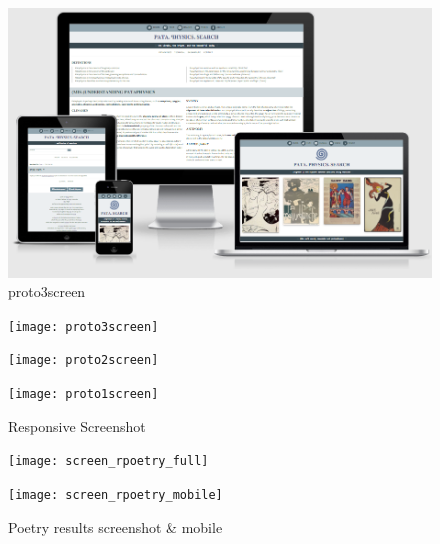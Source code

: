 \begin{figure}[!htbp] %
  \centering
  \includegraphics[width=\linewidth]{images/proto3screen}
\caption[proto3screen]{proto3screen}
\label{img:proto3screen}
\end{figure}

\begin{figure}[!htbp]
  \centering
  \begin{minipage}{\linewidth}
    \texttt{[image: proto3screen]}
  \end{minipage}
  \hspace{.05\linewidth}
  \begin{minipage}{\linewidth}
    \texttt{[image: proto2screen]}
  \end{minipage}
  \hspace{.05\linewidth}
  \begin{minipage}{\linewidth}
    \texttt{[image: proto1screen]}
  \end{minipage}
  \caption[responsive screenshots]{Responsive Screenshot}
\label{Respscreenshots}
\end{figure}

\begin{figure}[!htbp]
  \centering
  \begin{minipage}{.57\linewidth}
    \texttt{[image: screen\_rpoetry\_full]}
  \end{minipage}
  \hspace{.05\linewidth}
  \begin{minipage}{.27\linewidth}
    \texttt{[image: screen\_rpoetry\_mobile]}
  \end{minipage}
  \caption[screenshots]{Poetry results screenshot \& mobile}
\label{screenshots}
\end{figure}


